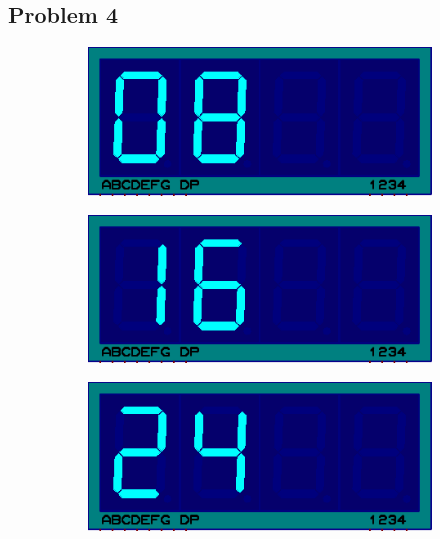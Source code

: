 \documentclass{lab_sheet}
\begin{document}
        \subsection*{Problem 4}
        \begin{figure}[H]
            \begin{subfigure}{.33\textwidth}
              \centering
              \includegraphics[frame,width=.9\linewidth]{../Figures/m8}  
              \label{fig:prob4-a}
              \caption{}
            \end{subfigure}
            \begin{subfigure}{.33\textwidth}
              \centering
              \includegraphics[frame,width=.9\linewidth]{../Figures/m16}  
              \label{fig:prob4-b}
              \caption{}
            \end{subfigure}
            \begin{subfigure}{.33\textwidth}
              \centering
                \includegraphics[frame,width=.9\linewidth]{../Figures/m24}  

\end{subfigure}
\end{figure}
\end{document}
